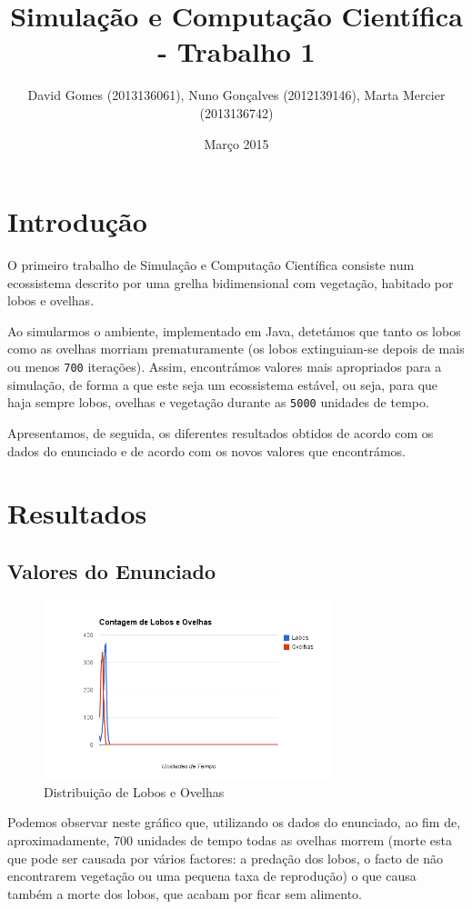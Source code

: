 \documentclass[12pt]{article}
\title{Simulação e Computação Científica - Trabalho 1}
\author{David Gomes (2013136061), Nuno Gonçalves (2012139146), Marta Mercier (2013136742)}
\date{Março 2015}
\begin{document}
\maketitle

\section{Introdução}
O primeiro trabalho de Simulação e Computação Científica consiste num ecossistema
descrito por uma grelha bidimensional com vegetação, habitado por lobos e ovelhas.

Ao simularmos o ambiente, implementado em Java, detetámos que tanto os lobos como
as ovelhas morriam prematuramente (os lobos extinguiam-se depois de mais ou menos
\texttt{700} iterações). Assim, encontrámos valores mais apropriados para a simulação, de
forma a que este seja um ecossistema estável, ou seja, para que haja sempre lobos, ovelhas e vegetação durante as \texttt{5000} unidades de tempo.

Apresentamos, de seguida, os diferentes resultados obtidos de acordo com os dados do
enunciado e de acordo com os novos valores que encontrámos.

\section{Resultados}
\subsection{Valores do Enunciado}

\begin{figure}[H]
  \centering
  \includegraphics[width=0.75\textwidth]{ovelhaslobos1}
  \caption{Distribuição de Lobos e Ovelhas}
\end{figure}

Podemos observar neste gráfico que, utilizando os dados do enunciado, ao fim de, aproximadamente, 700 unidades de tempo todas as ovelhas morrem (morte esta que pode ser causada por vários factores: a predação dos lobos, o facto de não encontrarem vegetação ou uma pequena taxa de reprodução) o que causa também a morte dos lobos, que acabam por ficar sem alimento.
\end{document}
